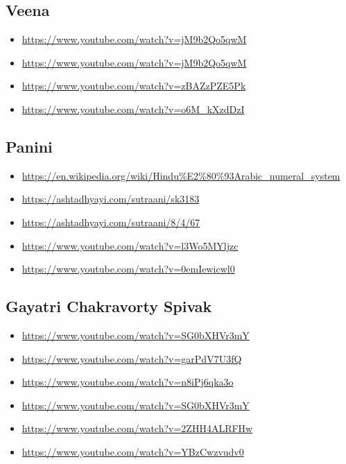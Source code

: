 \subsection{Veena}
\label{sec:org0a60965}
\begin{itemize}
\item \url{https://www.youtube.com/watch?v=jM9b2Qo5qwM}
\item \url{https://www.youtube.com/watch?v=jM9b2Qo5qwM}
\item \url{https://www.youtube.com/watch?v=zBAZzPZE5Pk}
\item \url{https://www.youtube.com/watch?v=o6M\_kXzdDzI}
\end{itemize}

\subsection{Panini}
\label{sec:org4613cce}
\begin{itemize}
\item \url{https://en.wikipedia.org/wiki/Hindu\%E2\%80\%93Arabic\_numeral\_system}
\item \url{https://ashtadhyayi.com/sutraani/sk3183}
\item \url{https://ashtadhyayi.com/sutraani/8/4/67}
\item \url{https://www.youtube.com/watch?v=l3Wo5MYljzc}
\item \url{https://www.youtube.com/watch?v=0emIewicwl0}
\end{itemize}




\subsection{Gayatri Chakravorty Spivak}
\label{sec:org5f9feec}
\begin{itemize}
\item \url{https://www.youtube.com/watch?v=SG0bXHVr3mY}
\item \url{https://www.youtube.com/watch?v=garPdV7U3fQ}
\item \url{https://www.youtube.com/watch?v=n8iPj6qka3o}
\item \url{https://www.youtube.com/watch?v=SG0bXHVr3mY}
\item \url{https://www.youtube.com/watch?v=2ZHH4ALRFHw}
\item \url{https://www.youtube.com/watch?v=YBzCwzvudv0}
\end{itemize}

